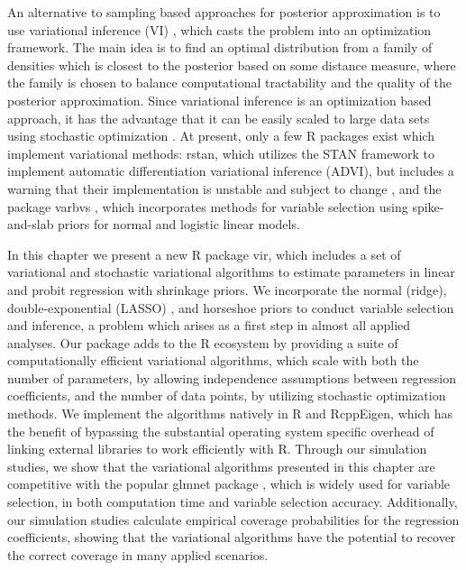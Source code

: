 \documentclass[]{article}
\let\proglang=\textsf
\newcommand{\pkg}[1]{{\fontseries{b}\selectfont #1}}
\begin{document}
An alternative to sampling based approaches for posterior approximation is to
use variational inference (VI) \citep{blei2017variational}, which casts the
problem into an optimization framework. The main idea is to find an optimal
distribution from a family of densities which is closest to the posterior based
on some distance measure, where the family is chosen to balance computational
tractability and the quality of the posterior approximation. Since variational
inference is an optimization based approach, it has the advantage that it can be
easily scaled to large data sets using stochastic optimization
\citep{hoffman2013svi}.  At present, only a few \proglang{R} packages exist
which implement variational methods: \pkg{rstan}, which utilizes the \pkg{STAN}
framework to implement automatic differentiation variational inference (ADVI),
but includes a warning that their implementation is unstable and subject to
change \citep{stan2018rstan, advipaper}, and the package \pkg{varbvs}
\citep{carbonetto2012scalable}, which incorporates methods for variable
selection using spike-and-slab priors for normal and logistic linear models.

In this chapter we present a new \proglang{R} package \pkg{vir}, which includes
a set of variational and stochastic variational algorithms to estimate
parameters in linear and probit regression with shrinkage priors.  We
incorporate the normal (ridge), double-exponential (LASSO)
\citep{park2008lasso}, and horseshoe \citep{carvalho2010horseshoe} priors to
conduct variable selection and inference, a problem which arises as a first step
in almost all applied analyses.  Our package adds to the \proglang{R} ecosystem
by providing a suite of computationally efficient variational algorithms, which
scale with both the number of parameters, by allowing independence assumptions
between regression coefficients, and the number of data points, by utilizing
stochastic optimization methods. We implement the algorithms natively in
\proglang{R} and \pkg{RcppEigen}, which has the benefit of bypassing the
substantial operating system specific overhead of linking external libraries to
work efficiently with \proglang{R}.  Through our simulation studies, we show
that the variational algorithms presented in this chapter are competitive with the
popular \pkg{glmnet} package \citep{glmnet}, which is widely used for variable
selection, in both computation time and variable selection accuracy.
Additionally, our simulation studies calculate empirical coverage probabilities
for the regression coefficients, showing that the variational algorithms have
the potential to recover the correct coverage in many applied scenarios. 
\end{document}
